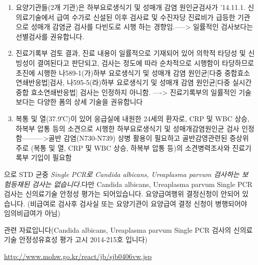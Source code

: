 {\begin{enumerate}[1.]\tightlist
\item 요양기관들(2개 기관)은 하부요로생식기 및 성매개 감염 원인균검사가 '14.11.1. 신의료기술에서 급여 수가로 신설된 이후 검사료 및 수진자당 진료비가 급등한 기관으로 성매개 감염균 검사를 다빈도로 시행 하는 경향임.-----> 일률적인 검사보다는 선별검사를 권유합니다. 
\item 진료기록부 검토 결과, 진료 내용이 일률적으로 기재되어 있어 의학적 타당성 및 신빙성이 결여된다고 판단되고, 검사는 정도에 따라 순차적으로 시행함이 타당하므로 초진에 시행한 나589-1(가)하부 요로생식기 및 성매개 감염 원인균[다중 중합효소연쇄반응법]검사, 나595-5(라)하부 요로생식기 및 성매개 감염 원인균[다중 실시간 중합 효소연쇄반응법] 검사는 인정하지 아니함. ----> 진료기록부의 일률적인 기술보다는 다양한 폼의 상세 기술을 권유합니다 
\item 복통 및 열(37.9℃)이 있어 응급실에 내원한 24세의 환자로, CRP 및 WBC 상승, 하복부 압통 등의 소견으로 시행한 하부요로생식기 및 성매개감염원인균 검사 인정함--------->골반 감염(N730-N739) 상병 활용이 필요하고 골반감영관련된 증상위주로 (복통 및 열, CRP 및 WBC 상승, 하복부 압통 등)의 소견병력조사와 진료기록부 기입이 필요함 
\end{enumerate}
\par
\medskip

으로 STD  균중  \emph{Single PCR로 Candida albicans,  Ureaplasma parvum 검사하는 보험등재된 검사는 없습니다.}다만 Candida albicans,  Ureaplasma parvum  Single PCR 검사는 신의료기술 안정성 평가는 되어있습니다. 요양급여행위 결정신청이 안되어 있습니다. (비급여로 검사후 검사실 또는 요양기관이 요양급여 결정 신청이 병행되어야 임의비급여가 아님) \par
관련 자료입니다(Candida albicans,  Ureaplasma parvum  Single PCR 검사의 신의료기술 안정성유효성 평가 고시 2014-215호 입니다)\par
\url{http://www.mohw.go.kr/react/jb/sjb0406vw.jsp}
}


